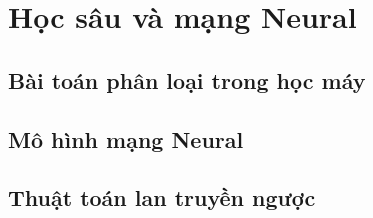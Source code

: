 \section{Học sâu và mạng Neural}

\subsection{Bài toán phân loại trong học máy}


\subsection{Mô hình mạng Neural}

\subsection{Thuật toán lan truyền ngược}

\begin{refsection}
\nocite{Lemons_2017,robinett2025dimensional}
\printbibliography
\end{refsection}
